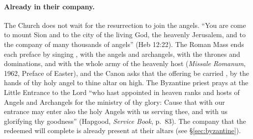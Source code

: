 \paragraph{Already in their company.} The Church does not wait for the
resurrection to join the angels. ``You are come to mount Sion and to the
city of the living God, the heavenly Jerusalem, and to the company of many
thousands of angels'' (Heb 12:22). The Roman Mass ends each preface by
singing , with the angels and archangels,
with the thrones and dominations, and with the whole army of the heavenly
host (\emph{Missale Romanum}, 1962, Preface of Easter), and the Canon asks
that the offering be carried , by the hands of thy holy angel to thine altar on high. The
Byzantine priest prays at the Little Entrance to the Lord ``who hast
appointed in heaven ranks and hosts of Angels and Archangels for the
ministry of thy glory: Cause that with our entrance may enter also the holy
Angels with us serving thee, and with us glorifying thy goodness''
(Hapgood, \emph{Service Book}, p.~83). The company that the redeemed will
complete is already present at their altars (see \S\ref{sec:byzantine}).
